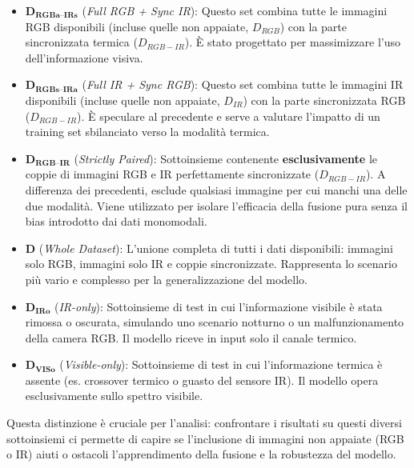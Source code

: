\documentclass[a4paper,12pt]{article}
\begin{document}
\begin{itemize}
    \item $\boldsymbol{D_{\text{RGBa--IRs}}}$ (\textit{Full RGB + Sync IR}): Questo set combina tutte le immagini RGB disponibili (incluse quelle non appaiate, $D_{RGB}$) con la parte sincronizzata termica ($D_{RGB-IR}$). È stato progettato per massimizzare l'uso dell'informazione visiva.
    
    \item $\boldsymbol{D_{\text{RGBs--IRa}}}$ (\textit{Full IR + Sync RGB}): Questo set combina tutte le immagini IR disponibili (incluse quelle non appaiate, $D_{IR}$) con la parte sincronizzata RGB ($D_{RGB-IR}$). È speculare al precedente e serve a valutare l'impatto di un training set sbilanciato verso la modalità termica.

    \item $\boldsymbol{D_{\text{RGB--IR}}}$ (\textit{Strictly Paired}): Sottoinsieme contenente \textbf{esclusivamente} le coppie di immagini RGB e IR perfettamente sincronizzate ($D_{RGB-IR}$). A differenza dei precedenti, esclude qualsiasi immagine per cui manchi una delle due modalità. Viene utilizzato per isolare l'efficacia della fusione pura senza il bias introdotto dai dati monomodali.

    \item $\boldsymbol{D}$ (\textit{Whole Dataset}): L'unione completa di tutti i dati disponibili: immagini solo RGB, immagini solo IR e coppie sincronizzate. Rappresenta lo scenario più vario e complesso per la generalizzazione del modello.

    \item $\boldsymbol{D_{\text{IRo}}}$ (\textit{IR-only}): Sottoinsieme di test in cui l'informazione visibile è stata rimossa o oscurata, simulando uno scenario notturno o un malfunzionamento della camera RGB. Il modello riceve in input solo il canale termico.

    \item $\boldsymbol{D_{\text{VISo}}}$ (\textit{Visible-only}): Sottoinsieme di test in cui l'informazione termica è assente (es. crossover termico o guasto del sensore IR). Il modello opera esclusivamente sullo spettro visibile.
\end{itemize}

Questa distinzione è cruciale per l'analisi: confrontare i risultati su questi diversi sottoinsiemi ci permette di capire se l'inclusione di immagini non appaiate (RGB o IR) aiuti o ostacoli l'apprendimento della fusione e la robustezza del modello.
\end{document}
